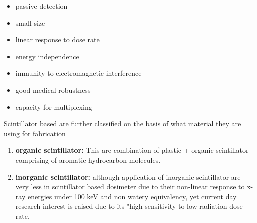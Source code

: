 \documentclass{article}
\begin{document}
\begin{multicols}{2}
\begin{itemize}
    \item passive detection
    \item small size
    \item linear response to dose rate
    \item energy independence 
    \item immunity to electromagnetic interference 
    \item good medical robustness
    \item capacity for multiplexing 
    
\end{itemize}

\noindent Scintillator based are further classified on the basis of what material they are using for fabrication
\begin{enumerate}
    \item \textbf{organic scintillator:} This are combination of plastic + organic scintillator comprising of aromatic hydrocarbon molecules.
    \item \textbf{inorganic scintillator:} although application of inorganic scintillator are very less in scintillator based dosimeter due to their non-linear response to x-ray energies under 100 keV and non watery equivalency, yet current day research interest is raised due to its "high sensitivity to low  radiation dose rate.
\end{enumerate}
\end{multicols}
\end{document}

